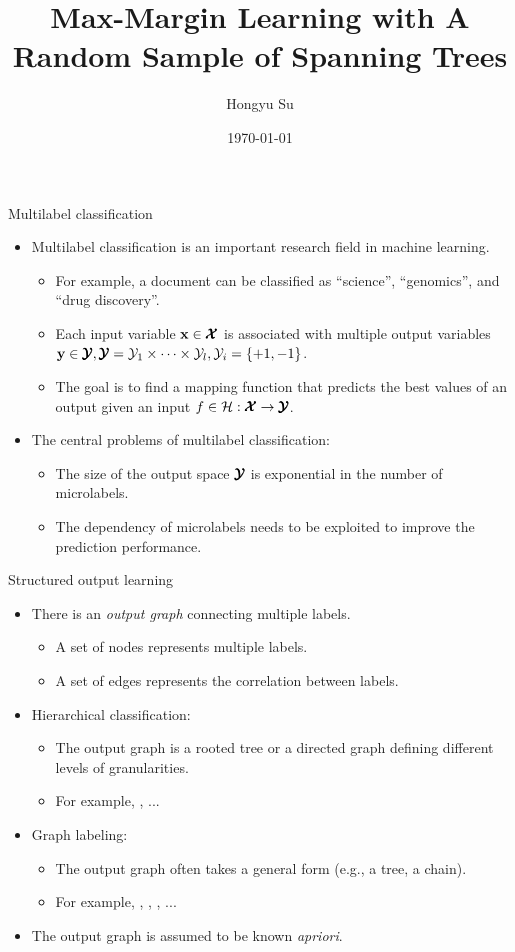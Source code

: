 \documentclass[first=dgreen,second=purple,logo=yellowexc]{aaltoslides}
\title{Max-Margin Learning with A Random Sample of Spanning Trees}
\author{Hongyu Su}
\institute[ICS]{
Helsinki Institute for Information Technology HIIT\\
Department of Computer Science\\
Aalto University
}
\date{ \today} %
\begin{document}
\aaltotitleframe



%
\begin{frame}{Multilabel classification}
	\begin{itemize}
		\item Multilabel classification is an important research field in machine learning.
		\begin{itemize}
			\item For example, a document can be classified as ``science'', ``genomics'', and ``drug discovery''.
			\item Each input variable $\mathbf {x}\in\pmb {\mathcal{X}}$ is associated with multiple output variables $\mathbf {y}\in\pmb {\mathcal{Y}},\pmb {\mathcal{Y}}=\mathcal{Y}_1\times\cdots\times\mathcal{Y}_l,\mathcal{Y}_i=\{+1,-1\}$.
			\item The goal is to find a mapping function that predicts the best values of an output given an input $f\in\mathcal{H}:\pmb {\mathcal{X}}\rightarrow\pmb {\mathcal{Y}}$.
		\end{itemize}
		\item The central problems of multilabel classification:
		\begin{itemize}
			\item The size of the output space $\pmb {\mathcal{Y}}$ is exponential in the number of microlabels.
			\item The dependency of microlabels needs to be exploited to improve the prediction performance.
		\end{itemize}
	\end{itemize}
\end{frame}



%
\begin{frame}{Structured output learning}
	\begin{itemize}
		\item There is an \textit{output graph} connecting multiple labels.
		\begin{itemize}
			\item A set of nodes represents multiple labels.
			\item A set of edges represents the correlation between labels.
		\end{itemize}
		\item Hierarchical classification:
		\begin{itemize}
			\item The output graph is a rooted tree or a directed graph defining different levels of granularities.
			\item For example, \svmstruct, ...
		\end{itemize}
		\item Graph labeling:
		\begin{itemize}
			\item The output graph often takes a general form (e.g., a tree, a chain).
			\item For example, \mmmn, \crf, \mmcrf, ...
		\end{itemize}
		\item The output graph is assumed to be known \textit{apriori}.
	\end{itemize}
\end{frame}
\end{document}
